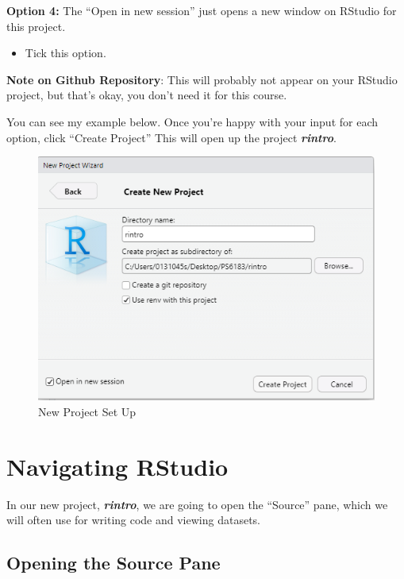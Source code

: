 \documentclass[
]{book}
\providecommand{\tightlist}{%
  \setlength{\itemsep}{0pt}\setlength{\parskip}{0pt}}
\begin{document}
\textbf{Option 4:} The ``Open in new session'' just opens a new window on RStudio for this project.

\begin{itemize}
\tightlist
\item
  Tick this option.
\end{itemize}

\textbf{Note on Github Repository}: This will probably not appear on your RStudio project, but that's okay, you don't need it for this course.

You can see my example below. Once you're happy with your input for each option, click ``Create Project'' This will open up the project \textbf{\emph{rintro}}.

\begin{figure}
\centering
\includegraphics{img/01-newproject-ma.png}
\caption{\label{fig:unnamed-chunk-13}New Project Set Up}
\end{figure}

\section{Navigating RStudio}\label{navigating-rstudio}

In our new project, \textbf{\emph{rintro}}, we are going to open the ``Source'' pane, which we will often use for writing code and viewing datasets.

\subsection{Opening the Source Pane}\label{opening-the-source-pane}
\end{document}

